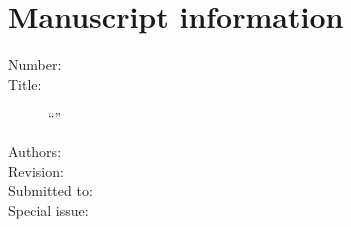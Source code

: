 \section*{Manuscript information}



\begin{description}

\item[Number:] \PaperId

\item[Title:] ``\PaperTitle''

\item[Authors:] \AuthorsInLetter

\item[Revision:] \PaperRevision

\item[Submitted to:] \Journal

\item[Special issue:] \SpecialIssueId

\end{description}



